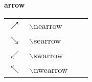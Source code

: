 			\textbf{arrow}\\
			\begin{tabular}{ p{} p{} 
							p{} p{}  }
			\toprule
			$\nearrow $				&$\backslash$nearrow \\
			$\searrow $				&$\backslash$searrow \\ 
			$\swarrow $			&$\backslash$swarrow \\ 
			$\nwarrow $			&$\backslash$nwearrow \\ 
			\bottomrule
			\end{tabular} \\






































